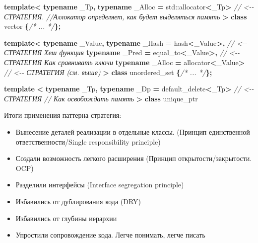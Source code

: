 \documentclass[14pt,a4paper]{article}
\providecommand{\tightlist}{%
	\setlength{\itemsep}{0pt}\setlength{\parskip}{0pt}}
\newenvironment{Shaded}{\begin{paragraph}}{\end{paragraph}}
\newenvironment{Highlighting}{\begin{paragraph}}{\end{paragraph}}
\newcommand{\KeywordTok}[1]{\textcolor[rgb]{0.13,0.29,0.53}{\textbf{#1}}}
\newcommand{\CommentTok}[1]{\textcolor[rgb]{0.56,0.35,0.01}{\textit{#1}}}
\newcommand{\OperatorTok}[1]{\textcolor[rgb]{0.81,0.36,0.00}{\textbf{#1}}}
\newcommand{\BuiltInTok}[1]{#1}
\newcommand{\NormalTok}[1]{#1}
\begin{document}
\begin{Shaded}
\begin{Highlighting}[]
\KeywordTok{template}\OperatorTok{\textless{}}
    \KeywordTok{typename}\NormalTok{ \_Tp}\OperatorTok{,}
    \KeywordTok{typename}\NormalTok{ \_Alloc }\OperatorTok{=} \BuiltInTok{std::}\NormalTok{allocator}\OperatorTok{\textless{}}\NormalTok{\_Tp}\OperatorTok{\textgreater{}}  \CommentTok{// \textless{}{-}{-} СТРАТЕГИЯ. }
                \CommentTok{//Аллокатор определяет, как будет выделяться память}
        \OperatorTok{\textgreater{}}
    \KeywordTok{class}\NormalTok{ vector }\OperatorTok{\{}\CommentTok{/* ... */}\OperatorTok{\};}

\KeywordTok{template}\OperatorTok{\textless{}}
    \KeywordTok{typename}\NormalTok{ \_Value}\OperatorTok{,}
    \KeywordTok{typename}\NormalTok{ \_Hash }\OperatorTok{=}\NormalTok{ hash}\OperatorTok{\textless{}}\NormalTok{\_Value}\OperatorTok{\textgreater{},}       \CommentTok{// \textless{}{-}{-} СТРАТЕГИЯ Хеш функция}
    \KeywordTok{typename}\NormalTok{ \_Pred }\OperatorTok{=}\NormalTok{ equal\_to}\OperatorTok{\textless{}}\NormalTok{\_Value}\OperatorTok{\textgreater{},}   \CommentTok{// \textless{}{-}{-} СТРАТЕГИЯ Как сравнивать ключи}
    \KeywordTok{typename}\NormalTok{ \_Alloc }\OperatorTok{=}\NormalTok{ allocator}\OperatorTok{\textless{}}\NormalTok{\_Value}\OperatorTok{\textgreater{}}  \CommentTok{// \textless{}{-}{-} СТРАТЕГИЯ (см. выше)}
       \OperatorTok{\textgreater{}}
    \KeywordTok{class}\NormalTok{ unordered\_set }\OperatorTok{\{}\CommentTok{/* ... */}\OperatorTok{\};}

\KeywordTok{template} \OperatorTok{\textless{}}
    \KeywordTok{typename}\NormalTok{ \_Tp}\OperatorTok{,} 
    \KeywordTok{typename}\NormalTok{ \_Dp }\OperatorTok{=}\NormalTok{ default\_delete}\OperatorTok{\textless{}}\NormalTok{\_Tp}\OperatorTok{\textgreater{}} \CommentTok{// \textless{}{-}{-} СТРАТЕГИЯ }
                            \CommentTok{// Как освобождать память}
    \OperatorTok{\textgreater{}}
    \KeywordTok{class}\NormalTok{ unique\_ptr}
\end{Highlighting}
\end{Shaded}

Итоги применения паттерна стратегия:

\begin{itemize}
\tightlist
\item
  Вынесение деталей реализации в отдельные классы. (Принцип единственной
  ответственности/Single responsibility principle)
\item
  Создали возможность легкого расширения (Принцип открытости/закрытости.
  OCP)
\item
  Разделили интерфейсы (Interface segregation principle)
\item
  Избавились от дублирования кода (DRY)
\item
  Избавились от глубины иерархии
\item
  Упростили сопровождение кода. Легче понимать, легче писать
\end{itemize}
\end{document}
